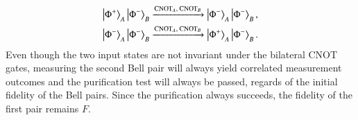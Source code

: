 \begin{solution}
\begin{enumerate}[label=(\alph*)]
    \begin{align*}
        \left| \Phi^+ \right\rangle_A\left| \Phi^- \right\rangle_B & \xrightarrow{\text{CNOT}_A,\text{ CNOT}_B} \left| \Phi^- \right\rangle_A\left| \Phi^- \right\rangle_B, \\
        \left| \Phi^- \right\rangle_A\left| \Phi^- \right\rangle_B & \xrightarrow{\text{CNOT}_A,\text{ CNOT}_B} \left| \Phi^+ \right\rangle_A\left| \Phi^- \right\rangle_B.
    \end{align*}
    Even though the two input states are not invariant under the bilateral CNOT gates, measuring the second Bell pair will always yield correlated measurement outcomes and the purification test will always be passed, regards of the initial fidelity of the Bell pairs.
    Since the purification always succeeds, the fidelity of the first pair remains $F$.
\end{enumerate}
\end{solution}